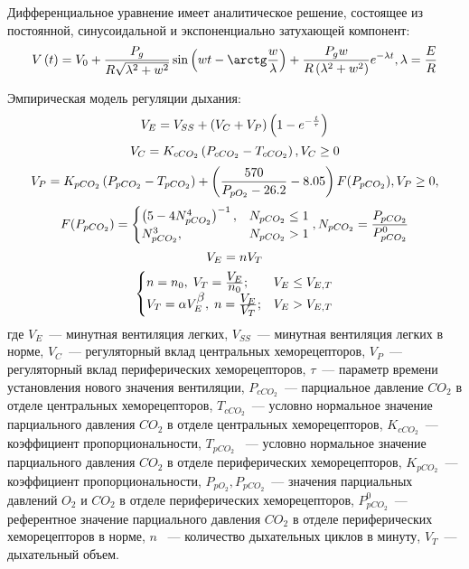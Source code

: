 Дифференциальное уравнение имеет аналитическое решение, состоящее из постоянной, синусоидальной и экспоненциально затухающей компонент:
\begin{equation}\label{V_analyt}
V\left(t\right)=V_{0}+\frac{P_{g}}{R\sqrt{\lambda^2+w^2}}\sin \left( wt-\arctg\frac{w}{\lambda} \right)+\frac{P_{g}w}{R\left(\lambda^2+w^2\right)}e^{-\lambda t}, \lambda=\frac{E}{R} \notag
\end{equation}

Эмпирическая модель регуляции дыхания:
\begin{equation}
V_{E}=V_{SS}+\left(V_{C}+V_{P}\right)\left(1-e^{-\frac{t}{\tau}}\right) \notag
\end{equation}
\begin{equation}
V_{C}=K_{cCO_{2}}\left(P_{cCO_{2}}-T_{cCO_{2}} \right), V_{C}\ge 0 \notag
\end{equation}
\begin{equation}
V_{P}=K_{pCO_{2}}\left(P_{pCO_{2}}-T_{pCO_{2}} \right)+\left(\frac{570}{P_{pO_{2}}-26.2}-8.05\right)F(P_{pCO_{2}}), V_{P}\ge 0, \notag
\end{equation}
\begin{equation}
F(P_{pCO_{2}})=\begin{cases}
\left(5-4N_{pCO_{2}}^4 \right)^{-1}, & N_{pCO_{2}}\le 1 \\
N_{pCO_{2}}^3, & N_{pCO_{2}}> 1 
\end{cases}, 
N_{pCO_{2}}=\frac{P_{pCO_{2}}}{P_{pCO_{2}}^0} \notag
\end{equation}
\begin{equation}
V_{E}=nV_{T} \notag
\end{equation}
\begin{equation} 
\begin{cases}
n=n_{0},\; V_{T}=\frac{\displaystyle V_{E}}{\displaystyle n_{0}}; & V_{E} \le V_{E,T}  \\
V_{T}=\alpha V_{E}^{\displaystyle \beta},\; n= \frac{\displaystyle V_{E}}{\displaystyle V_{T}}; & V_{E} > V_{E,T}
\end{cases}\notag
\end{equation}
где \( V_{E}\)~--- минутная вентиляция легких, 
\( V_{SS}\)~--- минутная вентиляция легких в норме, 
\( V_{C}\)~--- регуляторный вклад центральных хеморецепторов,
\( V_{P}\)~--- регуляторный вклад периферических хеморецепторов,
\( \tau\)~--- параметр времени установления нового значения вентиляции, \( P_{cCO_{2}}\)~--- парциальное давление $CO_{2}$ в отделе центральных хеморецепторов, 
\( T_{cCO_{2}}\)~--- условно нормальное значение парциального давления $CO_{2}$ в отделе центральных хеморецепторов, 
\( K_{cCO_{2}}\)~--- коэффициент пропорциональности, \( T_{pCO_{2}}\) ~--- условно нормальное значение парциального давления $CO_{2}$ в отделе периферических хеморецепторов, 
\( K_{pCO_{2}}\)~--- коэффициент пропорциональности, 
\( P_{pO_{2}}, P_{pCO_{2}}\)~--- значения парциальных давлений $O_{2}$ и $CO_{2}$ в отделе периферических хеморецепторов,
\( P_{pCO_{2}}^0\)~--- референтное значение парциального давления $CO_{2}$ в отделе периферических хеморецепторов в норме, \( n\)  ~---  количество дыхательных циклов в минуту, \( V_{T}\)~--- дыхательный объем.


